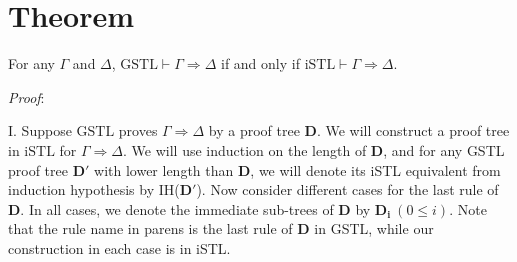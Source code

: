 \section{Theorem} \label{translation} For any $\Gamma$ and $\Delta$, $\text{GSTL} \vdash \Gamma \Rightarrow \Delta$ if and only if $\text{iSTL} \vdash \Gamma \Rightarrow \Delta$.

\textit{Proof}:

I. Suppose $\text{GSTL}$ proves $\Gamma \Rightarrow \Delta$ by a proof tree $\mathbf{D}$. We will construct a proof tree in $\text{iSTL}$ for $\Gamma \Rightarrow \Delta$. We will use induction on the length of $\mathbf{D}$, and for any GSTL proof tree $\mathbf{D'}$ with lower length than $\mathbf{D}$, we will denote its iSTL equivalent from induction hypothesis by IH($\mathbf{D'}$). Now consider different cases for the last rule of $\mathbf{D}$. In all cases, we denote the immediate sub-trees of $\mathbf{D}$ by $\mathbf{D_i} ~(0 \leq i)$. Note that the rule name in parens is the last rule of $\mathbf{D}$ in GSTL, while our construction in each case is in iSTL.
